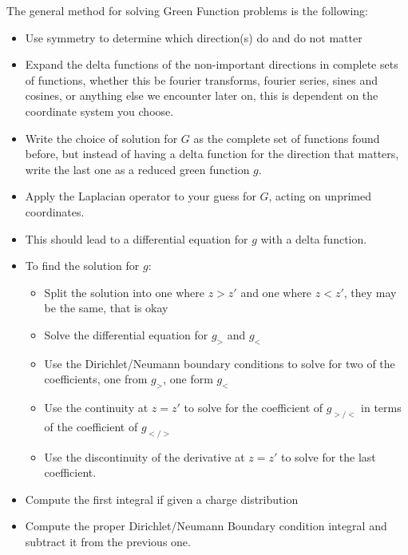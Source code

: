 \documentclass[12pt]{article}
\theoremstyle{plain}
\theoremstyle{definition}
\begin{document}
The general method for solving Green Function problems is the following:
\begin{itemize}
\item Use symmetry to determine which direction(s) do and do not matter
\item Expand the delta functions of the non-important directions in complete sets of functions, whether this be fourier transforms, fourier series, sines and cosines, or anything else we encounter later on, this is dependent on the coordinate system you choose. 
\item Write the choice of solution for $G$ as the complete set of functions found before, but instead of having a delta function for the direction that matters, write the last one as a reduced green function $g$.
\item Apply the Laplacian operator to your guess for $G$, acting on unprimed coordinates. 
\item This should lead to a differential equation for $g$ with a delta function. 
\item To find the solution for $g$:
  \begin{itemize}
  \item Split the solution into one where $z>z'$ and one where $z<z'$, they may be the same, that is okay
  \item Solve the differential equation for $g_>$ and $g_<$
  \item Use the Dirichlet/Neumann boundary conditions to solve for two of the coefficients, one from $g_>$, one form $g_<$
  \item Use the continuity at $z=z'$ to solve for the coefficient of $g_{>/<}$ in terms of the coefficient of $g_{</>}$
  \item Use the discontinuity of the derivative at $z=z'$ to solve for the last coefficient. 
  \end{itemize}
\item Compute the first integral if given a charge distribution
\item Compute the proper Dirichlet/Neumann Boundary condition integral and subtract it from the previous one. 
\end{itemize}
\end{document}
